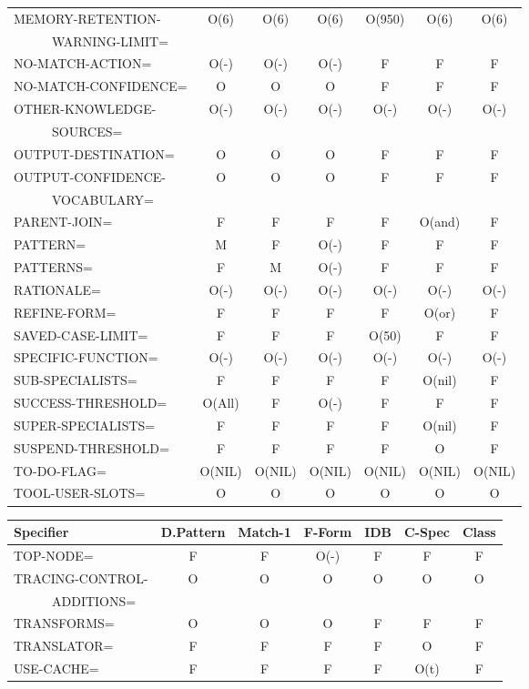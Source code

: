 \begin{tabular}{|l|c|c|c|c|c|c|}
MEMORY-RETENTION- & O(6) & O(6) & O(6) & O(950) & O(6) & O(6) \\
\ \ \ \ \ \ WARNING-LIMIT= & & & & & & \\
NO-MATCH-ACTION= & O(-) & O(-) & O(-) & F & F & F \\
NO-MATCH-CONFIDENCE= & O & O & O\footnotemark & F & F & F \\
OTHER-KNOWLEDGE- & O(-) & O(-) & O(-) & O(-) & O(-) & O(-) \\
\ \ \ \ \ \ SOURCES= & & & & & & \\
OUTPUT-DESTINATION= & O & O & O\footnotemark & F & F & F \\
OUTPUT-CONFIDENCE- & O & O & O\footnotemark & F & F & F \\
\ \ \ \ \ \ VOCABULARY= & & & & & & \\
PARENT-JOIN= & F & F & F & F & O(and) & F \\
PATTERN= & M & F & O(-) & F & F & F \\
PATTERNS= & F & M & O(-) & F & F & F \\
RATIONALE= & O(-) & O(-) & O(-) & O(-) & O(-) & O(-) \\
REFINE-FORM= & F & F & F & F & O(or) & F \\
SAVED-CASE-LIMIT= & F & F & F & O(50) & F & F \\
SPECIFIC-FUNCTION= & O(-) & O(-) & O(-) & O(-) & O(-) & O(-) \\
SUB-SPECIALISTS= & F & F & F & F & O(nil) & F \\
SUCCESS-THRESHOLD= & O(All) & F & O(-) & F & F & F \\
SUPER-SPECIALISTS= & F & F & F & F & O(nil) & F \\
SUSPEND-THRESHOLD= & F & F & F & F & O & F \\
TO-DO-FLAG= & O(NIL) & O(NIL) & O(NIL) & O(NIL) & O(NIL) & O(NIL) \\
TOOL-USER-SLOTS= & O & O & O & O & O & O\footnotemark \\ \hline
\end{tabular}
\addtocounter{footnote}{-4}
\addtocounter{footnote}{1}
\addtocounter{footnote}{1}
\addtocounter{footnote}{1}
\addtocounter{footnote}{1}
\newpage
\begin{tabular}{|l|c|c|c|c|c|c|} \hline
Specifier & D.Pattern & Match-1 & F-Form & IDB & C-Spec &
Class \\ \hline \hline
TOP-NODE= & F & F & O(-) & F & F & F \\
TRACING-CONTROL- & O & O & O & O & O & O\footnotemark \\
\ \ \ \ \ \ ADDITIONS= & & & & & &\\
TRANSFORMS= & O & O & O\footnotemark & F & F & F \\
TRANSLATOR= & F & F & F & F & O\footnotemark & F \\
USE-CACHE= & F & F & F & F & O(t) & F \\ \hline
\end{tabular}
